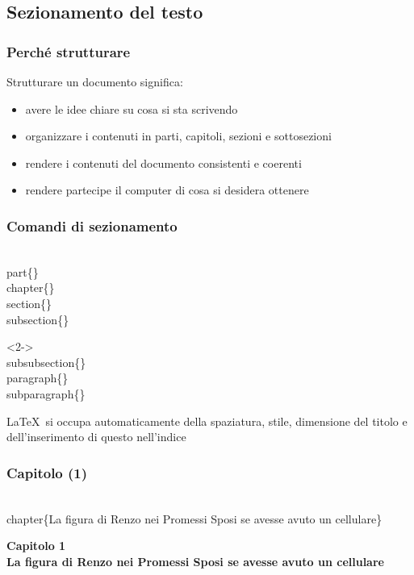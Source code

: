 \documentclass[svgnames,%
	ucs,%
	pdftex]{guitbeamer}
\begin{document}
\subsection{Sezionamento del testo}
\begin{frame}
  \frametitle{Perch\'e strutturare}
	Strutturare un documento significa:
	\begin{itemize}
		\item avere le idee chiare su cosa si sta scrivendo
		\item organizzare i contenuti in parti, capitoli, sezioni e sottosezioni
		\item rendere i contenuti del documento consistenti e coerenti
		\item rendere partecipe il computer di cosa si desidera ottenere
	\end{itemize}
\end{frame}
\begin{frame}
  \frametitle{Comandi di sezionamento}
	\begin{LaTeXcode}
		\\part\{\}\n
		\\chapter\{\}\n
		\\section\{\}\n
		\\subsection\{\}
	\end{LaTeXcode}
	\begin{LaTeXcode}<2->
		\\subsubsection\{\}\n
		\\paragraph\{\}\n
		\\subparagraph\{\}
	\end{LaTeXcode}
  \medskip
	\LaTeX\ si occupa automaticamente della spaziatura, stile, dimensione del titolo e dell'inserimento di questo nell'indice
\end{frame}
\begin{frame}
  \frametitle{Capitolo (1)}
	\begin{LaTeXcode}
		\alert{\\chapter\{}La figura di Renzo nei Promessi Sposi se avesse
		avuto un cellulare\alert{\}}
	\end{LaTeXcode}
	\begin{LaTeXoutput}\Large\bfseries
		\noindent Capitolo 1\\[2ex]
		\noindent La figura di Renzo nei Promessi Sposi se avesse avuto un cellulare
	\end{LaTeXoutput}
\end{frame}
\end{document}

